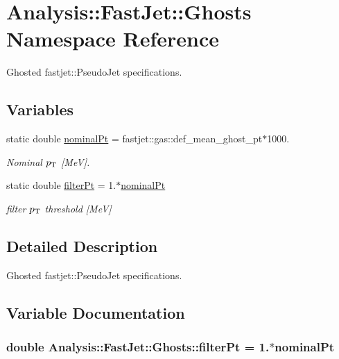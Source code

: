 \hypertarget{namespaceAnalysis_1_1FastJet_1_1Ghosts}{}\section{Analysis\+:\+:Fast\+Jet\+:\+:Ghosts Namespace Reference}
\label{namespaceAnalysis_1_1FastJet_1_1Ghosts}


Ghosted {\ttfamily fastjet\+::\+Pseudo\+Jet} specifications.  


\subsection*{Variables}
\begin{DoxyCompactItemize}
\item 
static double \hyperlink{namespaceAnalysis_1_1FastJet_1_1Ghosts_a22e0fc0b5688c128c5a0caa65b6a4794}{nominal\+Pt} = fastjet\+::gas\+::def\+\_\+mean\+\_\+ghost\+\_\+pt$\ast$1000.
\begin{DoxyCompactList}\small\item\em Nominal $ p_{\rm T} $ \mbox{[}MeV\mbox{]}. \end{DoxyCompactList}\item 
static double \hyperlink{namespaceAnalysis_1_1FastJet_1_1Ghosts_af83d2982eca3608672efba570c5209b2}{filter\+Pt} = 1.$\ast$\hyperlink{namespaceAnalysis_1_1FastJet_1_1Ghosts_a22e0fc0b5688c128c5a0caa65b6a4794}{nominal\+Pt}
\begin{DoxyCompactList}\small\item\em filter $ p_{\rm T} $ threshold \mbox{[}MeV\mbox{]} \end{DoxyCompactList}\end{DoxyCompactItemize}


\subsection{Detailed Description}
Ghosted {\ttfamily fastjet\+::\+Pseudo\+Jet} specifications. 

\subsection{Variable Documentation}
\subsubsection[{\texorpdfstring{filter\+Pt}{filterPt}}]{\setlength{\rightskip}{0pt plus 5cm}double Analysis\+::\+Fast\+Jet\+::\+Ghosts\+::filter\+Pt = 1.$\ast${\bf nominal\+Pt}\hspace{0.3cm}{\ttfamily [static]}}\hypertarget{namespaceAnalysis_1_1FastJet_1_1Ghosts_af83d2982eca3608672efba570c5209b2}{}\label{namespaceAnalysis_1_1FastJet_1_1Ghosts_af83d2982eca3608672efba570c5209b2}


